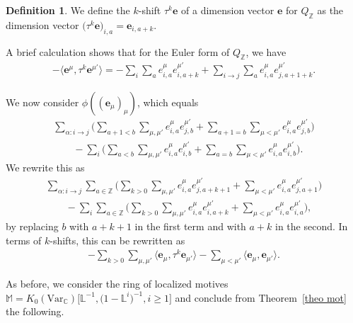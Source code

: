 \documentclass[10pt,a4paper]{amsart}
\numberwithin{equation}{section}
\theoremstyle{definition}
\newtheorem{Definition}[Theorem]{Definition}
\begin{document}
\begin{Definition}
We define the $k$-shift ${\tau}^k \mathbf{e}$ of a dimension vector $\mathbf{e}$ for $Q_\mathbb{Z}$ as the dimension vector
$
\bigl( {\tau}^k \mathbf{e}\bigr)_{i,a} = \mathbf{e}_{i,a+k} $.
\end{Definition}

A brief calculation shows that for the Euler form of $Q_\mathbb{Z}$, we have
\begin{align*}
-\big\langle\mathbf{e}^{\mu}, {\tau}^k \mathbf{e}^{\mu'}\big\rangle = - \sum_i \sum_a e_{i,a}^{\mu} e_{i, a+k}^{\mu'} + \sum_{i \rightarrow j} \sum_a e_{i,a}^{\mu} e_{j,a+1+k}^{\mu'} .
\end{align*}

We now consider $\phi((\mathbf{e}_\mu)_\mu)$, which equals
\begin{gather*}
\sum_{\alpha\colon i \rightarrow j} \biggl(\sum_{a+1 < b} \sum_{\mu, \mu'} e_{i,a}^{\mu} e_{j,b}^{\mu'} + \sum_{a+1 = b} \sum_{\mu < \mu'} e_{i,a}^{\mu} e_{j,b}^{\mu'}\biggr)\\
\qquad-\sum_{i} \biggl(\sum_{a < b} \sum_{\mu, \mu'} e_{i,a}^{\mu} e_{i,b}^{\mu'} + \sum_{a = b} \sum_{\mu < \mu'} e_{i,a}^{\mu} e_{i,b}^{\mu'}\biggr).
\end{gather*}
We rewrite this as
\begin{gather*}
\sum_{\alpha\colon i \rightarrow j} \sum_{a \in \mathbb{Z}} \biggl(\sum_{k > 0} \sum_{\mu, \mu'} e_{i,a}^{\mu} e_{j,a+k+1}^{\mu'} + \sum_{\mu < \mu'} e_{i,a}^{\mu} e_{j,a+1}^{\mu'}\biggr) \\
\qquad- \sum_{i} \sum_{a \in \mathbb{Z}} \biggl(\sum_{k > 0} \sum_{\mu, \mu'} e_{i,a}^{\mu} e_{i,a+k}^{\mu'} + \sum_{\mu < \mu'} e_{i,a}^{\mu} e_{i,a}^{\mu'}\biggr) ,
\end{gather*}
by replacing $b$ with $a+k+1$ in the first term and with $a+k$ in the second. In terms of $k$-shifts, this can be rewritten as
\begin{align*}
- \sum_{k > 0} \sum_{\mu, \mu'} \big\langle\mathbf{e}_{\mu}, {\tau}^k \mathbf{e}_{\mu'}\big\rangle - \sum_{\mu < \mu'} \langle\mathbf{e}_{\mu}, \mathbf{e}_{\mu'}\rangle.
\end{align*}

As before, we consider the ring of localized motives $ \mathbb{M} = K_0 (\text{Var}_{\mathbb{C}}) \big[\mathbb{L}^{-1}, \bigl(1- \mathbb{L}^i\bigr)^{-1}, i \geq 1\big]$ and conclude from Theorem~\ref{theo mot} the following.
\end{document}
